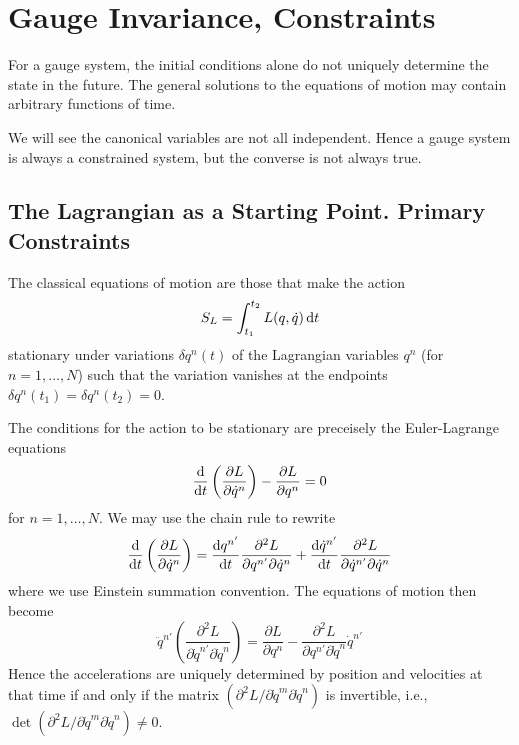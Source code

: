 \section{Gauge Invariance, Constraints}
\M
For a gauge system, the initial conditions alone do not uniquely
determine the state in the future. The general solutions to the
equations of motion may contain arbitrary functions of time.

We will see the canonical variables are not all independent. Hence a
gauge system is always a constrained system, but the converse is not
always true.

\subsection{The Lagrangian as a Starting Point. Primary Constraints}
The classical equations of motion are those that make the action
\begin{equation}
  S_{L} = \int^{t_{2}}_{t_{1}} L(q,\dot{q})\,\mathrm{d} t
\end{equation}
stationary under variations $\delta q^{n}(t)$ of the Lagrangian
variables $q^n$ (for $n=1,\dots,N$) such that the variation vanishes at
the endpoints $\delta q^{n}(t_{1})=\delta q^{n}(t_{2})=0$.

The conditions for the action to be stationary are preceisely the
Euler-Lagrange equations
\begin{equation}
  \frac{\mathrm{d}}{\mathrm{d} t}\left(\frac{\partial L}{\partial\dot{q}^{n}}\right)
  -\frac{\partial L}{\partial q^{n}}=0
\end{equation}
for $n=1,\dots, N$. We may use the chain rule to rewrite
\begin{equation}
  \frac{\mathrm{d}}{\mathrm{d} t}\left(\frac{\partial L}{\partial\dot{q}^{n}}\right)
  =\frac{\mathrm{d} q^{n'}}{\mathrm{d} t}\frac{\partial^{2} L}{\partial q^{n'}\partial\dot{q}^{n}}
  +\frac{\mathrm{d}\dot{q}^{n'}}{\mathrm{d} t}\frac{\partial^{2} L}{\partial\dot{q}^{n'}\partial\dot{q}^{n}}
\end{equation}
where we use Einstein summation convention. The equations of motion then
become
\begin{equation}
  \ddot{q}^{n'}\left(\frac{\partial^{2}L}{\partial\dot{q}^{n'}\partial\dot{q}^{n}}\right)
  =\frac{\partial L}{\partial q^{n}}
  -\frac{\partial^{2}L}{\partial q^{n'}\partial\dot{q}^{n}}\dot{q}^{n'}
\end{equation}
Hence the accelerations are uniquely determined by position and
velocities at that time if and only if the matrix
$(\partial^{2}L/\partial\dot{q}^{m}\partial\dot{q}^{n})$ is invertible,
i.e., $\det(\partial^{2}L/\partial\dot{q}^{m}\partial\dot{q}^{n})\neq0$.

